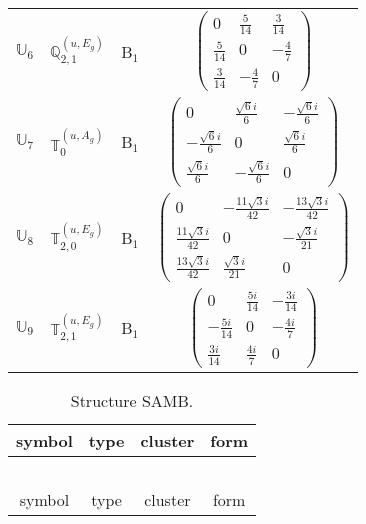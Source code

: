 \documentclass[fleqn,10pt,landscape]{article}
\begin{document}
\begin{itemize}
\begin{center}
\begin{longtable}{c|c|c|c}
$ \mathbb{U}_{6} $ & $\mathbb{Q}_{2,1}^{(u,E_{g})}$ & B$_{1}$ & $\begin{pmatrix} 0 & \frac{5}{14} & \frac{3}{14} \\ \frac{5}{14} & 0 & - \frac{4}{7} \\ \frac{3}{14} & - \frac{4}{7} & 0 \end{pmatrix}$ \\
$ \mathbb{U}_{7} $ & $\mathbb{T}_{0}^{(u,A_{g})}$ & B$_{1}$ & $\begin{pmatrix} 0 & \frac{\sqrt{6} i}{6} & - \frac{\sqrt{6} i}{6} \\ - \frac{\sqrt{6} i}{6} & 0 & \frac{\sqrt{6} i}{6} \\ \frac{\sqrt{6} i}{6} & - \frac{\sqrt{6} i}{6} & 0 \end{pmatrix}$ \\
$ \mathbb{U}_{8} $ & $\mathbb{T}_{2,0}^{(u,E_{g})}$ & B$_{1}$ & $\begin{pmatrix} 0 & - \frac{11 \sqrt{3} i}{42} & - \frac{13 \sqrt{3} i}{42} \\ \frac{11 \sqrt{3} i}{42} & 0 & - \frac{\sqrt{3} i}{21} \\ \frac{13 \sqrt{3} i}{42} & \frac{\sqrt{3} i}{21} & 0 \end{pmatrix}$ \\
$ \mathbb{U}_{9} $ & $\mathbb{T}_{2,1}^{(u,E_{g})}$ & B$_{1}$ & $\begin{pmatrix} 0 & \frac{5 i}{14} & - \frac{3 i}{14} \\ - \frac{5 i}{14} & 0 & - \frac{4 i}{7} \\ \frac{3 i}{14} & \frac{4 i}{7} & 0 \end{pmatrix}$ \\
\end{longtable}
\end{center}
\begin{center}
\renewcommand{\arraystretch}{1.3}
\begin{longtable}{c|c|c|c}
\caption{Structure SAMB.}
 \\
 \hline \hline
symbol & type & cluster & form \\ \hline \endfirsthead

\multicolumn{3}{l}{\tablename\ \thetable{}} \\
 \hline \hline
symbol & type & cluster & form \\ \hline \endhead


\end{longtable}
\end{center}
\end{itemize}
\end{document}
